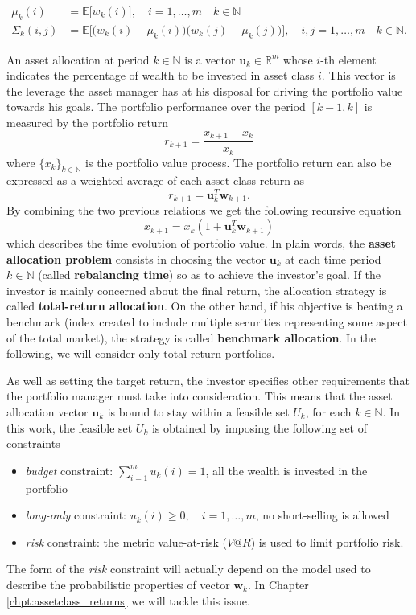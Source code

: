 \begin{align*}
\mu_k(i) & = \mathbb{E}\big[w_k(i)\big], \quad i = 1,\ldots,m \quad k \in \mathbb{N} \\[1.5ex]
\Sigma_k(i,j) &  = \mathbb{E}\bigg[\Big(w_k(i)-\mu_k(i)\Big)\Big(w_k(j)-\mu_k(j)\Big)\bigg], \quad i,j = 1,\ldots,m \quad k \in \mathbb{N}.
\end{align*}

 An asset allocation at period $k \in \mathbb{N}$ is a vector $\bm{u}_k \in \mathbb{R}^m$ whose $i$-th element indicates the percentage of wealth to be invested in asset class $i$. This vector is the leverage the asset manager has at his disposal for driving the portfolio value towards his goals. The portfolio performance over the period $[k-1,k]$ is measured by the portfolio return $$r_{k+1}=\frac{x_{k+1}-x_{k}}{x_k}$$ where $\{x_k\}_{k \in \mathbb{N}}$ is the portfolio value process. The portfolio return can also be expressed as a weighted average of each asset class return  as $$ r_{k+1} = \bm{u}_k^T \bm{w}_{k+1}.$$
 By combining the two previous relations we get the following recursive equation 
 \begin{equation}
 \boxed{x_{k+1} = x_k (1 + \bm{u}_k^T \bm{w}_{k+1})}
 \end{equation}
 which describes the time evolution of portfolio value. In plain words, the \textbf{asset allocation problem} consists in choosing the vector $\bm{u}_k$ at each time period $k \in \mathbb{N}$ (called \textbf{rebalancing time}) so as to achieve the  investor's goal. If the investor is mainly concerned about the final return, the allocation strategy is called \textbf{total-return allocation}. On the other hand, if his objective is beating a benchmark (index created to include multiple securities representing some aspect of the total market), the strategy is called \textbf{benchmark allocation}. In the following, we will consider only total-return portfolios.
 
 As well as setting the target return, the investor specifies other requirements that the portfolio manager must take into consideration. This means that  the asset allocation vector $\bm{u}_k$ is bound to stay within a feasible set $U_k$, for each $k \in \mathbb{N}$. In this work, the feasible set $U_k$ is obtained by imposing the following set of constraints
 \begin{itemize}
 	\item \textit{budget} constraint: $\sum_{i=1}^{m}u_k(i)=1$, all the wealth is invested in the portfolio
 	\item \textit{long-only} constraint: $u_k(i) \geq 0,\quad i = 1,\ldots,m$, no short-selling is allowed
 	\item \textit{risk} constraint: the metric value-at-risk ($V@R$) is used to limit portfolio risk. 
 \end{itemize}
The form of the \textit{risk} constraint will actually depend on the model used to describe the probabilistic properties of vector $\bm{w}_k$. In Chapter \ref{chpt:assetclass_returns} we will tackle this issue.
